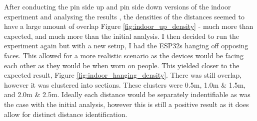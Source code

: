 \documentclass{l4proj}
\begin{document}
After conducting the pin side up and pin side down versions of the indoor experiment and analysing the results , the densities of the distances seemed to have a large amount of overlap Figure \ref{fig:indoor_up_density} - much more than expected, and much more than the initial analysis. I then decided to run the experiment again but with a new setup, I had the ESP32s hanging off opposing faces. This allowed for a more realistic scenario as the devices would be facing each other as they would be when worn on people. This yielded closer to the expected result, Figure \ref{fig:indoor_hanging_density}. There was still overlap, however it was clustered into sections. These clusters were 0.5m, 1.0m \& 1.5m, and 2.0m \& 2.5m. Ideally each distance would be separately indentifiable as was the case with the initial analysis, however this is still a positive result as it does allow for distinct distance identification.
\end{document}
